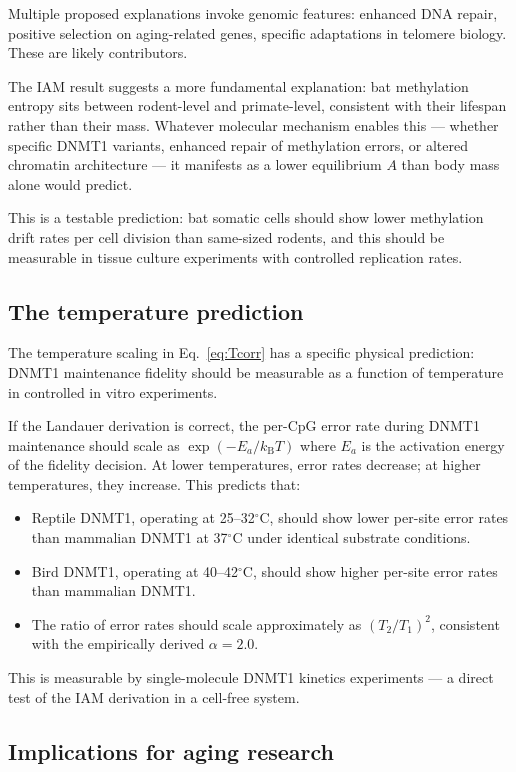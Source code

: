 \documentclass[11pt,a4paper]{article}
\newcommand{\Ascore}{A}
\newcommand{\kB}{k_{\mathrm{B}}}
\begin{document}
Multiple proposed explanations invoke genomic features: enhanced DNA repair,
positive selection on aging-related genes, specific adaptations in telomere
biology. These are likely contributors.

The IAM result suggests a more fundamental explanation: bat methylation
entropy sits between rodent-level and primate-level, consistent with their
lifespan rather than their mass. Whatever molecular mechanism enables
this --- whether specific DNMT1 variants, enhanced repair of methylation errors,
or altered chromatin architecture --- it manifests as a lower equilibrium $\Ascore$
than body mass alone would predict.

This is a testable prediction: bat somatic cells should show lower methylation
drift rates per cell division than same-sized rodents, and this should be
measurable in tissue culture experiments with controlled replication rates.

\subsection{The temperature prediction}

The temperature scaling in Eq.~\eqref{eq:Tcorr} has a specific physical
prediction: DNMT1 maintenance fidelity should be measurable as a function
of temperature in controlled in vitro experiments.

If the Landauer derivation is correct, the per-CpG error rate during DNMT1
maintenance should scale as $\exp(-E_a/\kB T)$ where $E_a$ is the activation
energy of the fidelity decision. At lower temperatures, error rates decrease;
at higher temperatures, they increase. This predicts that:
\begin{itemize}
\item Reptile DNMT1, operating at 25--32$^\circ$C, should show lower per-site
error rates than mammalian DNMT1 at 37$^\circ$C under identical substrate conditions.
\item Bird DNMT1, operating at 40--42$^\circ$C, should show higher per-site
error rates than mammalian DNMT1.
\item The ratio of error rates should scale approximately as $(T_2/T_1)^2$,
consistent with the empirically derived $\alpha = 2.0$.
\end{itemize}

This is measurable by single-molecule DNMT1 kinetics experiments --- a direct
test of the IAM derivation in a cell-free system.

\subsection{Implications for aging research}
\end{document}
